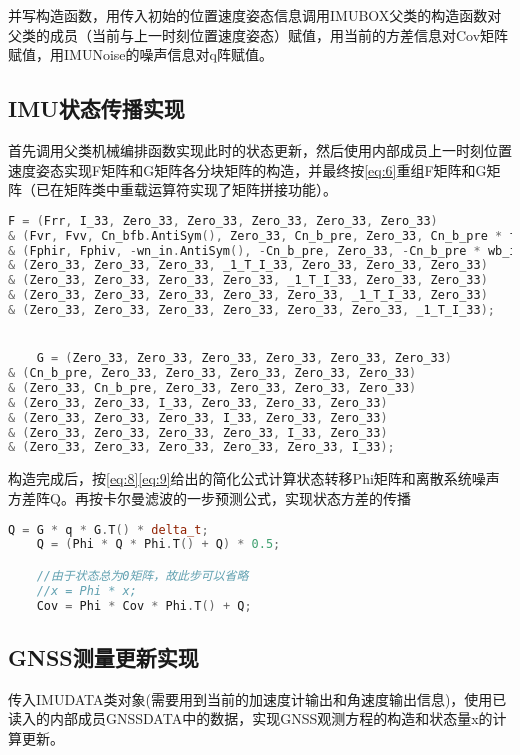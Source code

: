 \documentclass[codepkg=listings,theme=fancy]{course-report}
\begin{document}
并写构造函数，用传入初始的位置速度姿态信息调用IMUBOX父类的构造函数对父类的成员（当前与上一时刻位置速度姿态）赋值，用当前的方差信息对Cov矩阵赋值，用IMUNoise的噪声信息对q阵赋值。

\subsection{IMU状态传播实现}
首先调用父类机械编排函数实现此时的状态更新，然后使用内部成员上一时刻位置速度姿态实现F矩阵和G矩阵各分块矩阵的构造，并最终按\eqref{eq:6}重组F矩阵和G矩阵（已在矩阵类中重载运算符实现了矩阵拼接功能）。
\lstset{basicstyle=\footnotesize}
\begin{lstlisting}[language=C++,emph={Matrix,ANGLE,Vector,IMUError,IMUDATA,IMUNoise,GNSSDATA,IMUBOX},emphstyle=\color{cyan}]
	F = (Frr, I_33, Zero_33, Zero_33, Zero_33, Zero_33, Zero_33)
& (Fvr, Fvv, Cn_bfb.AntiSym(), Zero_33, Cn_b_pre, Zero_33, Cn_b_pre * fb.diag())
& (Fphir, Fphiv, -wn_in.AntiSym(), -Cn_b_pre, Zero_33, -Cn_b_pre * wb_ib.diag(), Zero_33)
& (Zero_33, Zero_33, Zero_33, _1_T_I_33, Zero_33, Zero_33, Zero_33)
& (Zero_33, Zero_33, Zero_33, Zero_33, _1_T_I_33, Zero_33, Zero_33)
& (Zero_33, Zero_33, Zero_33, Zero_33, Zero_33, _1_T_I_33, Zero_33)
& (Zero_33, Zero_33, Zero_33, Zero_33, Zero_33, Zero_33, _1_T_I_33);


	G = (Zero_33, Zero_33, Zero_33, Zero_33, Zero_33, Zero_33)
& (Cn_b_pre, Zero_33, Zero_33, Zero_33, Zero_33, Zero_33)
& (Zero_33, Cn_b_pre, Zero_33, Zero_33, Zero_33, Zero_33)
& (Zero_33, Zero_33, I_33, Zero_33, Zero_33, Zero_33)
& (Zero_33, Zero_33, Zero_33, I_33, Zero_33, Zero_33)
& (Zero_33, Zero_33, Zero_33, Zero_33, I_33, Zero_33)
& (Zero_33, Zero_33, Zero_33, Zero_33, Zero_33, I_33);

\end{lstlisting}

构造完成后，按\eqref{eq:8}\eqref{eq:9}给出的简化公式计算状态转移Phi矩阵和离散系统噪声方差阵Q。再按卡尔曼滤波的一步预测公式，实现状态方差的传播
\lstset{basicstyle=\small}
\begin{lstlisting}[language=C++,emph={Matrix,ANGLE,Vector,IMUError,IMUDATA,IMUNoise,GNSSDATA,IMUBOX},emphstyle=\color{cyan}]
	Q = G * q * G.T() * delta_t;
	Q = (Phi * Q * Phi.T() + Q) * 0.5;

	//由于状态总为0矩阵，故此步可以省略
	//x = Phi * x;
	Cov = Phi * Cov * Phi.T() + Q;

\end{lstlisting}

\subsection{GNSS测量更新实现}
传入IMUDATA类对象(需要用到当前的加速度计输出和角速度输出信息)，使用已读入的内部成员GNSSDATA中的数据，实现GNSS观测方程的构造和状态量x的计算更新。
\end{document}

